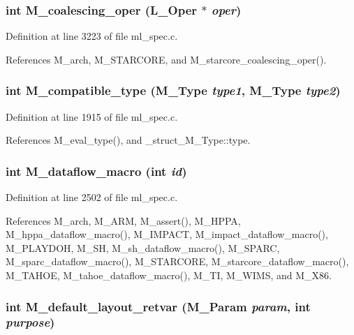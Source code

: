 \subsubsection{\setlength{\rightskip}{0pt plus 5cm}int M\_\-coalescing\_\-oper (L\_\-Oper $\ast$ {\em oper})}\label{ml__spec_8c_2243a2b27f9737106e63de72360add38}




Definition at line 3223 of file ml\_\-spec.c.

References M\_\-arch, M\_\-STARCORE, and M\_\-starcore\_\-coalescing\_\-oper().
\subsubsection{\setlength{\rightskip}{0pt plus 5cm}int M\_\-compatible\_\-type (\bf{M\_\-Type} {\em type1}, \bf{M\_\-Type} {\em type2})}\label{ml__spec_8c_3090229b6d25eec2f18603c3ba0f6ba4}




Definition at line 1915 of file ml\_\-spec.c.

References M\_\-eval\_\-type(), and \_\-struct\_\-M\_\-Type::type.
\subsubsection{\setlength{\rightskip}{0pt plus 5cm}int M\_\-dataflow\_\-macro (int {\em id})}\label{ml__spec_8c_9e2d030328725b623a16731f21483104}




Definition at line 2502 of file ml\_\-spec.c.

References M\_\-arch, M\_\-ARM, M\_\-assert(), M\_\-HPPA, M\_\-hppa\_\-dataflow\_\-macro(), M\_\-IMPACT, M\_\-impact\_\-dataflow\_\-macro(), M\_\-PLAYDOH, M\_\-SH, M\_\-sh\_\-dataflow\_\-macro(), M\_\-SPARC, M\_\-sparc\_\-dataflow\_\-macro(), M\_\-STARCORE, M\_\-starcore\_\-dataflow\_\-macro(), M\_\-TAHOE, M\_\-tahoe\_\-dataflow\_\-macro(), M\_\-TI, M\_\-WIMS, and M\_\-X86.
\subsubsection{\setlength{\rightskip}{0pt plus 5cm}int M\_\-default\_\-layout\_\-retvar (\bf{M\_\-Param} {\em param}, int {\em purpose})}\label{ml__spec_8c_d45b0a04a6501a38785e68cb84bf1c05}




